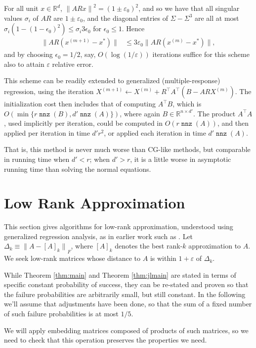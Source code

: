 \documentclass{sig-alternate}
\newcommand{\normF}[1]{{\| #1 \|}_F}
\newcommand{\norm}[1]{{\| #1 \|}}
\DeclareMathOperator{\nnz}{\mathtt{nnz}}
\newcommand{\eps}{\varepsilon}
\newcommand{\R}{{\mathbb R}}
\begin{document}
For all unit $x\in\R^d$,
$\norm{ARx}^2 = (1\pm \eps_0)^2$, and so
we have that all singular values $\sigma_i$ of $AR$ are $1\pm\eps_0$,
and the diagonal entries of $\Sigma - \Sigma^3$
are all at most $\sigma_i(1- (1 - \epsilon_0)^2) \le \sigma_i 3\epsilon_0$ for 
$\epsilon_0\le 1$. Hence 
\begin{align*}
\norm{AR(x^{(m+1)} - x^*)}
	 & \le 3\eps_0 \norm{AR(x^{(m)} - x^*)},
\end{align*}
and by choosing $\epsilon_0= 1/2$, say, $O(\log(1/\eps))$ iterations suffice for this
scheme also to attain $\eps$ relative error.

This scheme can be readily extended to generalized (multiple-response)
regression, using the iteration
$X^{(m+1)} \gets X^{(m)} + R^\top A^\top (B - ARX^{(m)})$.
The initialization cost then includes that of computing
$A^\top B$, which is $O(\min\{ r\nnz(B), d'\nnz(A)\})$,
where again $B\in \R^{n\times d'}$. The product $A^\top A$,
used implicitly per iteration, could be computed in $O(r\nnz(A))$,
and then applied per iteration in time $d'r^2$,
or applied each iteration in time $d'\nnz(A)$. 

That is, this method is never much worse than CG-like methods, but
comparable in running time when $d'< r$; when $d'>r$,
it is a little worse in asymptotic running time than solving the normal equations.
\fi 


\section{Low Rank Approximation}\label{sec:low rank}

This section gives algorithms for low-rank approximation, understood
using generalized regression analysis, as in earlier work such as \cite{s06,cw09}.
Let $\Delta_k \equiv \normF{A-[A]_k}$, where $[A]_k$ denotes
the best rank-$k$ approximation to $A$.
We seek low-rank matrices whose distance to $A$ is within $1+\eps$ of $\Delta_k$.

While Theorem \ref{thm:main} and Theorem \ref{thm:jlmain} 
are stated in terms of specific constant probability of success,
they can be re-stated and proven so that the failure probabilities are arbitrarily small, but still
constant. In the following we'll assume that adjustments have been done, so that the sum
of a fixed number of such failure probabilities is at most $1/5$.

We will apply embedding matrices composed of products of such matrices, so we need to check
that this operation preserves the properties we need.
\end{document}
